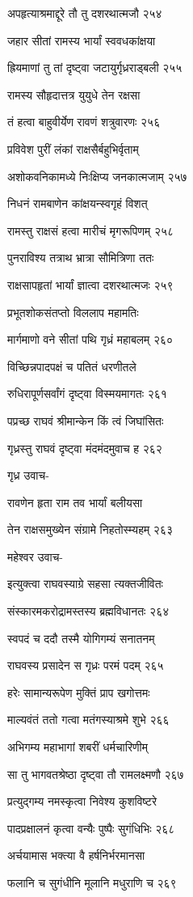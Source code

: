 अपहृत्याश्रमाद्दूरे तौ तु दशरथात्मजौ २५४

जहार सीतां रामस्य भार्यां स्ववधकांक्षया

ह्रियमाणां तु तां दृष्ट्वा जटायुर्गृध्रराड्बली २५५

रामस्य सौहृदात्तत्र युयुधे तेन रक्षसा

तं हत्वा बाहुवीर्येण रावणं शत्रुवारणः २५६

प्रविवेश पुरीं लंकां राक्षसैर्बहुभिर्वृताम्

अशोकवनिकामध्ये निःक्षिप्य जनकात्मजाम् २५७

निधनं रामबाणेन कांक्षयन्स्वगृहं विशत्

रामस्तु राक्षसं हत्वा मारीचं मृगरूपिणम् २५८

पुनराविश्य तत्राथ भ्रात्रा सौमित्रिणा ततः

राक्षसापहृतां भार्यां ज्ञात्वा दशरथात्मजः २५९

प्रभूतशोकसंतप्तो विललाप महामतिः

मार्गमाणो वने सीतां पथि गृध्रं महाबलम् २६०

विच्छिन्नपादपक्षं च पतितं धरणीतले

रुधिरापूर्णसर्वांगं दृष्ट्वा विस्मयमागतः २६१

पप्रच्छ राघवं श्रीमान्केन किं त्वं जिघांसितः

गृध्रस्तु राघवं दृष्ट्वा मंदमंदमुवाच ह २६२

गृध्र उवाच-

रावणेन हृता राम तव भार्यां बलीयसा

तेन राक्षसमुख्येन संग्रामे निहतोस्म्यहम् २६३

महेश्वर उवाच-

इत्युक्त्वा राघवस्याग्रे सहसा त्यक्तजीवितः

संस्कारमकरोद्रामस्तस्य ब्रह्मविधानतः २६४

स्वपदं च ददौ तस्मै योगिगम्यं सनातनम्

राघवस्य प्रसादेन स गृध्रः परमं पदम् २६५

हरेः सामान्यरूपेण मुक्तिं प्राप खगोत्तमः

माल्यवंतं ततो गत्वा मतंगस्याश्रमे शुभे २६६

अभिगम्य महाभागां शबरीं धर्मचारिणीम्

सा तु भागवतश्रेष्ठा दृष्ट्वा तौ रामलक्ष्मणौ २६७

प्रत्युद्गम्य नमस्कृत्वा निवेश्य कुशविष्टरे

पादप्रक्षालनं कृत्वा वन्यैः पुष्पैः सुगंधिभिः २६८

अर्चयामास भक्त्या वै हर्षनिर्भरमानसा

फलानि च सुगंधीनि मूलानि मधुराणि च २६९


